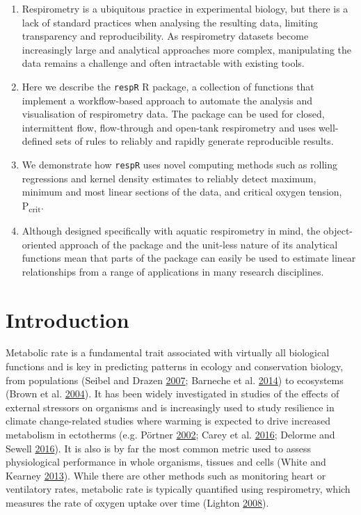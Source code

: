 \documentclass[a4paper,10pt, oneside]{memoir}
\begin{document}
\begin{enumerate}
\def\labelenumi{\arabic{enumi}.}
\tightlist
\item
  Respirometry is a ubiquitous practice in experimental biology, but there is a lack of standard practices when analysing the resulting data, limiting transparency and reproducibility. As respirometry datasets become increasingly large and analytical approaches more complex, manipulating the data remains a challenge and often intractable with existing tools.
\item
  Here we describe the \texttt{respR} R package, a collection of functions that implement a workflow-based approach to automate the analysis and visualisation of respirometry data. The package can be used for closed, intermittent flow, flow-through and open-tank respirometry and uses well-defined sets of rules to reliably and rapidly generate reproducible results.
\item
  We demonstrate how \texttt{respR} uses novel computing methods such as rolling regressions and kernel density estimates to reliably detect maximum, minimum and most linear sections of the data, and critical oxygen tension, P\textsubscript{crit}.
\item
  Although designed specifically with aquatic respirometry in mind, the object-oriented approach of the package and the unit-less nature of its analytical functions mean that parts of the package can easily be used to estimate linear relationships from a range of applications in many research disciplines.
\end{enumerate}

\hypertarget{introduction-3}{%
\section{Introduction}\label{introduction-3}}

Metabolic rate is a fundamental trait associated with virtually all biological functions and is key in predicting patterns in ecology and conservation biology, from populations (Seibel and Drazen \protect\hyperlink{ref-Seibel2007}{2007}; Barneche et al. \protect\hyperlink{ref-Barneche2014}{2014}) to ecosystems (Brown et al. \protect\hyperlink{ref-Brown2004}{2004}).
It has been widely investigated in studies of the effects of external stressors on organisms and is increasingly used to study resilience in climate change-related studies where warming is expected to drive increased metabolism in ectotherms (e.g. Pörtner \protect\hyperlink{ref-Portner2002}{2002}; Carey et al. \protect\hyperlink{ref-Carey2016}{2016}; Delorme and Sewell \protect\hyperlink{ref-Delorme2016}{2016}).
It is also is by far the most common metric used to assess physiological performance in whole organisms, tissues and cells (White and Kearney \protect\hyperlink{ref-White2013}{2013}).
While there are other methods such as monitoring heart or ventilatory rates, metabolic rate is typically quantified using respirometry, which measures the rate of oxygen uptake over time (Lighton \protect\hyperlink{ref-Lighton2008}{2008}).
\end{document}
